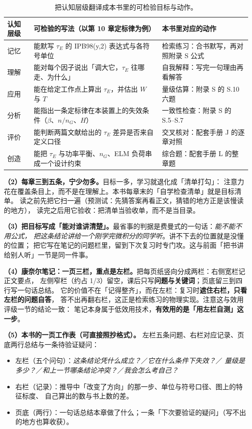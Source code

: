 \begin{table}[htbp]
\centering
\caption{把认知层级翻译成本书里的可检验目标与动作。}
\label{tab:app-i-bloom}
{\small
\begin{tabular}{@{}p{2.2cm}p{6.2cm}p{7.0cm}@{}}
\toprule
认知层级 & 可检验的写法（以第 10 章定标律为例） & 本书里对应的动作 \\
\midrule
记忆 & 能默写 $\tau_E$ 的 IPB98(y,2) 表达式与各符号单位 & 检索练习：合书默写，再对照附录 S 公式 \\
理解 & 能对每个因子说出「调大它，$\tau_E$ 往哪走、为什么」 & 自我解释：写完一句理由再看解答 \\
应用 & 能在给定工作点上算出 $\tau_E$，并估出 $W$ 与 $T$ & 量级估算：附录 S 的 S.10 六题 \\
分析 & 能指出一条定标律在本装置上的失效条件（$\beta$、$n/n_G$、$H$） & 一致性检查：附录 S 的 S.5--S.7 \\
评价 & 能判断两篇文献给出的 $\tau_E$ 差异是否来自定义口径 & 交叉核对：配套手册 J 的逐章对照 \\
创造 & 能把 $\tau_E$ 与功率平衡、$n_G$、ELM 负荷串成一个设计约束 & 综合题：配套手册 L 的整章题 \\
\bottomrule
\end{tabular}}
\end{table}

\textbf{（2）每章三到五条，宁少勿多。}目标一多，学习就退化成「清单打勾」：
注意力花在覆盖条目上，而不是在理解上。本书每章末的「自学检查清单」就是目标清单。
读之前先把它扫一遍（预测试：先猜答案再看正文，猜错的地方正是该慢读的地方），
读完之后用它验收：把清单当验收单，而不是当目录。

\textbf{（3）把目标写成「能对谁讲清楚」。}最省事的判据是费曼式的一句话：\emph{能不能不用公式，
把这条结论讲给一个刚学完微积分的同学听}。讲不下去的位置就是没懂的位置；
把它写在笔记的问题栏里，留到下次复习时专门攻。这与前面「把书讲给别人听」一节是同一件事。

\textbf{（4）康奈尔笔记：一页三栏，重点是左栏。}把每页纸竖向分成两栏：右侧宽栏记正文要点，
左侧窄栏（约占 1/3）留空，课后只写\textbf{问题与关键词}；页底留三到四行写一句话总结。
它的价值不在「记得整齐」，而在左栏：复习时\textbf{遮住右栏，只看左栏的问题自答}，
答不出再翻右栏，这正是检索练习的物理实现。注意这与效用评级一节的结论一致：
笔记本身属于低效用技术，\textbf{有效用的是「用左栏自测」这一步}。

\textbf{（5）本书的一页工作表（可直接照抄格式）。}
左栏五条问题、右栏对应记录、页底两行总结与一条待验证疑问：

\begin{itemize}
  \item 左栏（五个问句）：\emph{这条结论凭什么成立？}／\emph{它在什么条件下失效？}／
        \emph{量级是多少？}／\emph{和上一节哪条结论冲突？}／\emph{我会怎么考自己？}
  \item 右栏（记录）：推导中「改变了方向」的那一步、单位与符号口径、图上的特征标度、
        自己算出的数与书上数的差。
  \item 页底（两行）：一句话总结本章做了什么；一条「下次要验证的疑问」（写不出的地方也算收获）。
\end{itemize}

